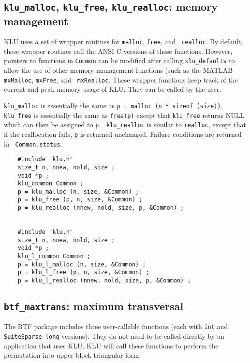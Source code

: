 \documentclass[11pt]{article}
\begin{document}
\subsection{{\tt klu\_malloc}, {\tt klu\_free}, {\tt klu\_realloc}:
memory management}

KLU uses a set of wrapper routines for {\tt malloc}, {\tt free}, and {\tt
realloc}.  By default, these wrapper routines call the ANSI C versions of these
functions.  However, pointers to functions in {\tt Common} can be modified
after calling {\tt klu\_defaults} to allow the use of other memory management
functions (such as the MATLAB {\tt mxMalloc}, {\tt mxFree}, and {\tt
mxRealloc}.  These wrapper functions keep track of the current and peak memory
usage of KLU.  They can be called by the user.

{\tt klu\_malloc} is essentially the same as {\tt p = malloc (n * sizeof
(size))}, {\tt klu\_free} is essentially the same as {\tt free(p)} except that
{\tt klu\_free} returns NULL which can then be assigned to {\tt p}.  {\tt
klu\_realloc} is similar to {\tt realloc}, except that if the reallocation
fails, {\tt p} is returned unchanged.  Failure conditions are returned in {\tt
Common.status}.

{\footnotesize
\begin{verbatim}
    #include "klu.h"
    size_t n, nnew, nold, size ;
    void *p ;
    klu_common Common ;
    p = klu_malloc (n, size, &Common) ;
    p = klu_free (p, n, size, &Common) ;
    p = klu_realloc (nnew, nold, size, p, &Common) ;


    #include "klu.h"
    size_t n, nnew, nold, size ;
    void *p ;
    klu_l_common Common ;
    p = klu_l_malloc (n, size, &Common) ;
    p = klu_l_free (p, n, size, &Common) ;
    p = klu_l_realloc (nnew, nold, size, p, &Common) ;
    \end{verbatim}
}

\subsection{{\tt btf\_maxtrans}: maximum transversal}

The BTF package includes three user-callable functions (each with {\tt int}
and {\tt SuiteSparse\_long} versions).  They do not need to be called directly by an
application that uses KLU.  KLU will call these functions to perform the
permutation into upper block triangular form.
\end{document}
